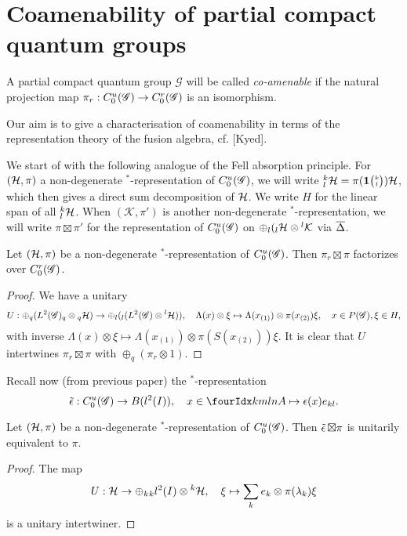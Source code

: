 \section{Coamenability of partial compact quantum groups}

\begin{Def} A partial compact quantum group $\mathscr{G}$ will be called \emph{co-amenable} if the natural projection map $\pi_r:C^{u}_{0}(\mathscr{G})\rightarrow C^{r}_{0}(\mathscr{G})$ is an isomorphism.
\end{Def}

Our aim is to give a characterisation of coamenability in terms of the representation theory of the fusion algebra, cf. [Kyed].

We start of with the following analogue of the Fell absorption principle. For $(\mathcal{H},\pi)$ a non-degenerate $^*$-representation of $C^{u}_{0}(\mathscr{G})$, we will write ${}^{k}_{l}\mathcal{H} = \pi(\mathbf{1}{\tiny {\begin{pmatrix} k\\l\end{pmatrix}}})\mathcal{H}$, which then gives a direct sum decomposition of $\mathcal{H}$. We write $H$ for the linear span of all ${}^{k}_{l}\mathcal{H}$. When $(\mathcal{K},\pi')$ is another non-degenerate $^*$-representation, we will write $\pi \boxtimes \pi'$ for the representation of $C^{u}_{0}(\mathscr{G})$ on $\oplus_l ({}_l\mathcal{H}\otimes {}^l\mathcal{K}$ via $\overline{\Delta}$.

\begin{Lem} Let $(\mathcal{H},\pi)$ be a non-degenerate $^*$-representation of $C^{u}_{0}(\mathscr{G})$. Then $\pi_r\boxtimes \pi$ factorizes over $C^{r}_{0}(\mathscr{G})$.
\end{Lem}

\begin{proof}  We have a unitary \[U: \oplus_q (L^2(\mathscr{G})_q\otimes {}_q\mathcal{H} ) \rightarrow \oplus_l ({}_l (L^2(\mathscr{G})\otimes {}^l\mathcal{H})),\quad \Lambda(x)\otimes \xi \mapsto \Lambda(x_{(1)})\otimes \pi(x_{(2)})\xi,\quad x\in P(\mathscr{G}),\xi\in H,\] with inverse $\Lambda(x)\otimes \xi \mapsto \Lambda(x_{(1)})\otimes \pi(S(x_{(2)}))\xi$. It is clear that $U$ intertwines $\pi_r\boxtimes \pi$ with $\oplus_q (\pi_r\otimes 1)$.
\end{proof} 

Recall now (from previous paper) the $^*$-representation \[\weps: \CuG \rightarrow B(l^2(I)), \quad x\in \Gr{A}{k}{l}{m}{n}\mapsto \epsilon(x) e_{kl}.\]

\begin{Lem}\label{LemUnit} Let $(\mathcal{H},\pi)$ be a non-degenerate $^*$-representation of $C^{u}_{0}(\mathscr{G})$. Then $\operatorname{\tilde{\epsilon}}\boxtimes \pi$ is unitarily equivalent to $\pi$.
\end{Lem} 
\begin{proof} The map \[U: \mathcal{H} \rightarrow \oplus_k {}_kl^2(I)\otimes {}^k\mathcal{H},\quad \xi \mapsto \sum_k e_k\otimes \pi(\lambda_k)\xi\] is a unitary intertwiner.
\end{proof} 

